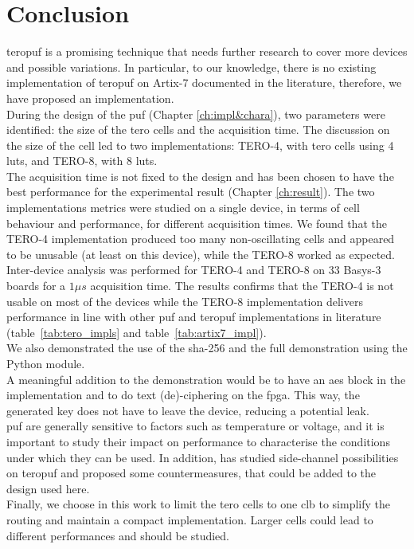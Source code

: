 \chapter{Conclusion}





\acrshort{teropuf} is a promising technique that needs further research to cover more devices and possible variations. In particular, to our knowledge, there is no existing implementation of \acrshort{teropuf} on Artix-7 documented in the literature, therefore, we have proposed an implementation.\\

During the design of the \acrshort{puf} (Chapter \ref{ch:impl&chara}), two parameters were identified: the size of the \acrshort{tero} cells and the acquisition time. The discussion on the size of the cell led to two implementations: TERO-4, with \acrshort{tero} cells using 4 \acrshort{lut}s, and TERO-8, with 8 \acrshort{lut}s.\\

The acquisition time is not fixed to the design and has been chosen to have the best performance for the experimental result (Chapter \ref{ch:result}).
The two implementations metrics were studied on a single device, in terms of cell behaviour and performance, for different acquisition times. We found that the TERO-4 implementation produced too many non-oscillating cells and appeared to be unusable (at least on this device), while the TERO-8 worked as expected.\\

Inter-device analysis was performed for TERO-4 and TERO-8 on 33 Basys-3 boards for a $1 \mu s$ acquisition time. The results confirms that the TERO-4 is not usable on most of the devices while the TERO-8 implementation delivers performance in line with other \acrshort{puf} and \acrshort{teropuf} implementations in literature (table~\ref{tab:tero_impls} and table~\ref{tab:artix7_impl}).\\
 
We also demonstrated the use of the \acrshort{sha}-256 and the full demonstration using the Python module.\\

A meaningful addition to the demonstration would be to have an \acrfull{aes} block in the implementation and to do text (de)-ciphering on the \acrshort{fpga}. This way, the generated key does not have to leave the device, reducing a potential leak.\\
\acrshort{puf} are generally sensitive to factors such as temperature or voltage, and it is important to study their impact on performance to characterise the conditions under which they can be used.
In addition, \cite{tebelmann_side-channel_2019} has studied side-channel possibilities on \acrshort{teropuf} and proposed some countermeasures, that could be added to the design used here.\\
Finally, we choose in this work to limit the \acrshort{tero} cells to one \acrshort{clb} to simplify the routing and maintain a compact implementation. Larger cells could lead to different performances and should be studied.